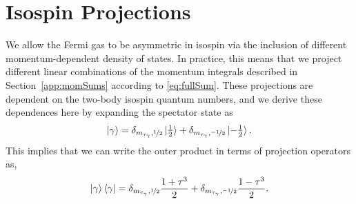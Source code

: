 \section{Isospin Projections}
We allow the Fermi gas to be asymmetric in isospin via the inclusion of different momentum-dependent density of states. In practice, this means that we project different linear combinations of the momentum integrals described in Section~\ref{app:momSums} according to \eqref{eq:fullSum}. These projections are dependent on the two-body isospin quantum numbers, and we derive these dependences here by expanding the spectator state as 
\begin{equation}
\ket{\gamma}=\delta_{m_{\tau_\gamma},\nicefrac{1}{2}}\ket{\tfrac{1}{2}}+\delta_{m_{\tau_\gamma},\nicefrac{-1}{2}}\ket{-\tfrac{1}{2}}.
\end{equation}
This implies that we can write the outer product in terms of projection operators as,
\begin{equation}\label{eq:tauProjections}
\ket{\gamma}\bra{\gamma} = \delta_{m_{\tau_\gamma},\nicefrac{1}{2}}\dfrac{1+\tau^3}{2}+\delta_{m_{\tau_\gamma},\nicefrac{-1}{2}}\frac{1-\tau^3}{2}.
\end{equation}

